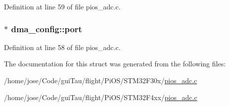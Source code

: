 Definition at line 59 of file pios\-\_\-adc.\-c.

\hypertarget{structdma__config_a90a2a53a8d99c37df9555f77633ee508}{
\subsubsection[{port}]{ $\ast$ dma\-\_\-config\-::port}}\label{structdma__config_a90a2a53a8d99c37df9555f77633ee508}


Definition at line 58 of file pios\-\_\-adc.\-c.



The documentation for this struct was generated from the following files\-:\begin{DoxyCompactItemize}
\item 
/home/jose/\-Code/gui\-Tau/flight/\-Pi\-O\-S/\-S\-T\-M32\-F30x/\hyperlink{_s_t_m32_f30x_2pios__adc_8c}{pios\-\_\-adc.\-c}\item 
/home/jose/\-Code/gui\-Tau/flight/\-Pi\-O\-S/\-S\-T\-M32\-F4xx/\hyperlink{_s_t_m32_f4xx_2pios__adc_8c}{pios\-\_\-adc.\-c}\end{DoxyCompactItemize}
